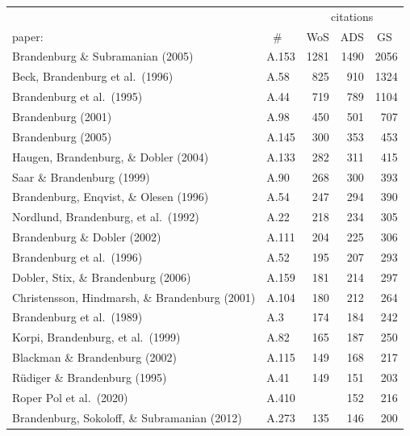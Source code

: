 \documentclass{article}
\begin{document}
\begin{tabular}{llrrr}
      &    & \multicolumn{3}{c}{citations}\\
paper:& $\;\;$\# & WoS & ADS & GS~ \\
\hline        
Brandenburg \& Subramanian (2005)              & A.153 &1281 &1490 &2056 \\
Beck, Brandenburg et al.\ (1996)               & A.58  & 825 & 910 &1324 \\
Brandenburg et al.\ (1995)                     & A.44  & 719 & 789 &1104 \\
Brandenburg (2001)                             & A.98  & 450 & 501 & 707 \\
Brandenburg (2005)                             & A.145 & 300 & 353 & 453 \\
Haugen, Brandenburg, \& Dobler (2004)          & A.133 & 282 & 311 & 415 \\
Saar \& Brandenburg (1999)                     & A.90  & 268 & 300 & 393 \\
Brandenburg, Enqvist, \& Olesen (1996)         & A.54  & 247 & 294 & 390 \\
Nordlund, Brandenburg, et al.\ (1992)          & A.22  & 218 & 234 & 305 \\
Brandenburg \& Dobler (2002)                   & A.111 & 204 & 225 & 306 \\
Brandenburg et al.\ (1996)                     & A.52  & 195 & 207 & 293 \\
Dobler, Stix, \& Brandenburg (2006)            & A.159 & 181 & 214 & 297 \\
Christensson, Hindmarsh, \& Brandenburg (2001) & A.104 & 180 & 212 & 264 \\
Brandenburg et al.\ (1989)                     & A.3   & 174 & 184 & 242 \\
Korpi, Brandenburg, et al.\ (1999)             & A.82  & 165 & 187 & 250 \\
Blackman \& Brandenburg (2002)                 & A.115 & 149 & 168 & 217 \\
R\"udiger \& Brandenburg (1995)                & A.41  & 149 & 151 & 203 \\
Roper Pol et al.\ (2020)                       & A.410 &     & 152 & 216 \\
Brandenburg, Sokoloff, \& Subramanian (2012)   & A.273 & 135 & 146 & 200 \\
\end{tabular}
\vspace{2mm}
\end{document}
